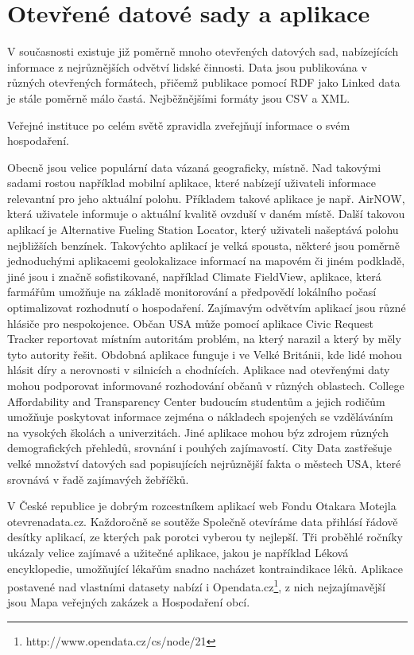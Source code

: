 \section{Otevřené datové sady a aplikace}

V současnosti existuje již poměrně mnoho otevřených datových sad, nabízejících informace z nejrůznějších odvětví lidské činnosti. Data jsou publikována v různých otevřených formátech, přičemž publikace pomocí RDF jako Linked data je stále poměrně málo častá. Nejběžnějšími formáty jsou CSV a XML.

Veřejné instituce po celém světě zpravidla zveřejňují informace o svém hospodaření.

Obecně jsou velice populární data vázaná geograficky, místně. Nad takovými sadami rostou například mobilní aplikace, které nabízejí uživateli informace relevantní pro jeho aktuální polohu. Příkladem takové aplikace je např. AirNOW, která uživatele informuje o aktuální kvalitě ovzduší v daném místě. Další takovou aplikací je Alternative Fueling Station Locator, který uživateli našeptává polohu nejbližších benzínek. Takovýchto aplikací je velká spousta, některé jsou poměrně jednoduchými aplikacemi geolokalizace informací na mapovém či jiném podkladě, jiné jsou i značně sofistikované, například Climate FieldView, aplikace, která farmářům umožňuje na základě monitorování a předpovědí lokálního počasí optimalizovat rozhodnutí o hospodaření.
Zajímavým odvětvím aplikací jsou různé hlásiče pro nespokojence. Občan USA může pomocí aplikace Civic Request Tracker reportovat místním autoritám problém, na který narazil a který by měly tyto autority řešit. Obdobná aplikace funguje i ve Velké Británii, kde lidé mohou hlásit díry a nerovnosti v silnicích a chodnících.
Aplikace nad otevřenými daty mohou podporovat informované rozhodování občanů v různých oblastech. College Affordability and Transparency Center budoucím studentům a jejich rodičům umožňuje poskytovat informace zejména o nákladech spojených se vzděláváním na vysokých školách a univerzitách.
Jiné aplikace mohou býz zdrojem různých demografických přehledů, srovnání i pouhých zajímavostí. City Data zastřešuje velké množství datových sad popisujících nejrůznější fakta o městech USA, které srovnává v řadě zajímavých žebříčků.

V České republice je dobrým rozcestníkem aplikací web Fondu Otakara Motejla otevrenadata.cz. Každoročně se soutěže Společně otevíráme data přihlásí řádově desítky aplikací, ze kterých pak porotci vyberou ty nejlepší. Tři proběhlé ročníky ukázaly velice zajímavé a užitečné aplikace, jakou je například Léková encyklopedie, umožňující lékařům snadno nacházet kontraindikace léků. Aplikace postavené nad vlastními datasety nabízí i Opendata.cz\footnote{http://www.opendata.cz/cs/node/21}, z nich nejzajímavější jsou Mapa veřejných zakázek a Hospodaření obcí.

